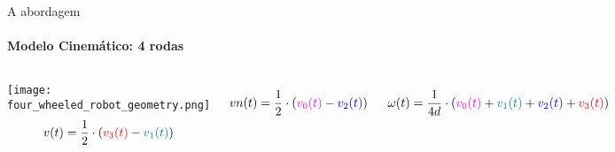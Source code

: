 \begin{frame}[t]{A abordagem}
  \transboxout[duration=0.5]
  \framesubtitle{Modelo Cinemático: 4 rodas}
  \begin{columns}
    \texttt{[image: four\_wheeled\_robot\_geometry.png]}
      \begin{equation*}
        v(t) = 
        \frac{1}{2} \cdot
        \left(
          {\color[rgb]{1,0,0} v_3(t)} - 
          {\color[rgb]{0,0.5,0.5} v_1(t)}
        \right)
      \end{equation*}

      \begin{equation*}
        vn(t) = 
        \frac{1}{2} \cdot
        \left(
          {\color[rgb]{1,0,1} v_0(t)} - 
          {\color[rgb]{0,0,1} v_2(t)}
        \right)
      \end{equation*}

      \begin{equation*}
        \omega(t) =
        \frac{1}{4d}\cdot
        \left(
          {\color[rgb]{1,0,1} v_0(t)} + 
          {\color[rgb]{0,0.5,0.5} v_1(t)} +
          {\color[rgb]{0,0,1} v_2(t)} +
          {\color[rgb]{1,0,0} v_3(t)} 
        \right)
      \end{equation*}
  \end{columns}
\end{frame}

